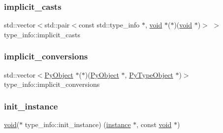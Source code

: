 \mbox{\label{structtype__info_ae87b2f5ab971392a547757b0cf0c173e}} 
\subsubsection{\texorpdfstring{implicit\_casts}{implicit\_casts}}
{\footnotesize\ttfamily std\+::vector$<$std\+::pair$<$const std\+::type\+\_\+info $\ast$, \mbox{\hyperlink{_s_d_l__opengles2__gl2ext_8h_ae5d8fa23ad07c48bb609509eae494c95}{void}} $\ast$($\ast$)(\mbox{\hyperlink{_s_d_l__opengles2__gl2ext_8h_ae5d8fa23ad07c48bb609509eae494c95}{void}} $\ast$)$>$ $>$ type\+\_\+info\+::implicit\+\_\+casts}

\mbox{\label{structtype__info_aea372863c3f5dfb6d5625480373ce432}} 
\subsubsection{\texorpdfstring{implicit\_conversions}{implicit\_conversions}}
{\footnotesize\ttfamily std\+::vector$<$\mbox{\hyperlink{_python27_2object_8h_aadc84ac7aed2cfa6f20c25f62bf3dac7}{Py\+Object}} $\ast$($\ast$)(\mbox{\hyperlink{_python27_2object_8h_aadc84ac7aed2cfa6f20c25f62bf3dac7}{Py\+Object}} $\ast$, \mbox{\hyperlink{_python27_2object_8h_a42a55dd6e973872c7a6bc61632070f6f}{Py\+Type\+Object}} $\ast$)$>$ type\+\_\+info\+::implicit\+\_\+conversions}

\mbox{\label{structtype__info_a2670999c513361a3a569238f51ecc450}} 
\subsubsection{\texorpdfstring{init\_instance}{init\_instance}}
{\footnotesize\ttfamily \mbox{\hyperlink{_s_d_l__opengles2__gl2ext_8h_ae5d8fa23ad07c48bb609509eae494c95}{void}}($\ast$ type\+\_\+info\+::init\+\_\+instance) (\mbox{\hyperlink{structinstance}{instance}} $\ast$, const \mbox{\hyperlink{_s_d_l__opengles2__gl2ext_8h_ae5d8fa23ad07c48bb609509eae494c95}{void}} $\ast$)}

